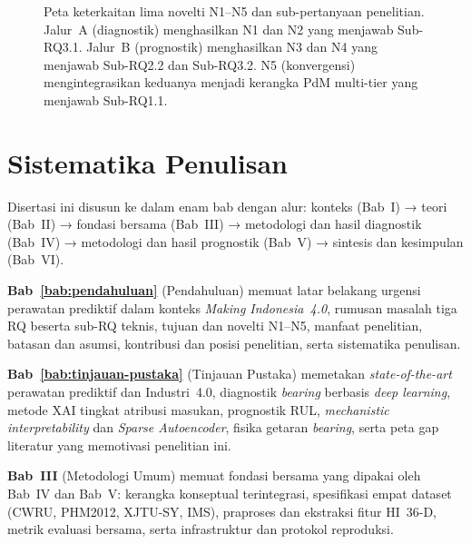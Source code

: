 \begin{figure}[ht]
{%
  }
  \caption{Peta keterkaitan lima novelti N1–N5 dan sub-pertanyaan penelitian.
           Jalur~A (diagnostik) menghasilkan N1 dan N2 yang menjawab Sub-RQ3.1.
           Jalur~B (prognostik) menghasilkan N3 dan N4 yang menjawab
           Sub-RQ2.2 dan Sub-RQ3.2.
           N5 (konvergensi) mengintegrasikan keduanya menjadi kerangka PdM
           multi-tier yang menjawab Sub-RQ1.1.}
  \label{fig:bab1_kontribusi}
\end{figure}


\section{Sistematika Penulisan}
\label{sec:bab1_sistematika}

Disertasi ini disusun ke dalam enam bab dengan alur: konteks (Bab~I)
→ teori (Bab~II) → fondasi bersama (Bab~III) → metodologi dan hasil
diagnostik (Bab~IV) → metodologi dan hasil prognostik (Bab~V)
→ sintesis dan kesimpulan (Bab~VI).

\textbf{Bab~\ref{bab:pendahuluan}} (Pendahuluan) memuat latar belakang
urgensi perawatan prediktif dalam konteks \emph{Making Indonesia~4.0},
rumusan masalah tiga RQ beserta sub-RQ teknis, tujuan dan novelti
N1–N5, manfaat penelitian, batasan dan asumsi, kontribusi dan posisi
penelitian, serta sistematika penulisan.

\textbf{Bab~\ref{bab:tinjauan-pustaka}} (Tinjauan Pustaka) memetakan
\emph{state-of-the-art} perawatan prediktif dan Industri~4.0,
diagnostik \emph{bearing} berbasis \emph{deep learning}, metode XAI tingkat
atribusi masukan, prognostik RUL, \emph{mechanistic interpretability}
dan \emph{Sparse Autoencoder}, fisika getaran \emph{bearing}, serta peta
gap literatur yang memotivasi penelitian ini.

\textbf{Bab~III} (Metodologi Umum) memuat fondasi bersama yang
dipakai oleh Bab~IV dan Bab~V: kerangka konseptual terintegrasi,
spesifikasi empat dataset (CWRU, PHM2012, XJTU-SY, IMS), praproses
dan ekstraksi fitur HI~36-D, metrik evaluasi bersama, serta
infrastruktur dan protokol reproduksi.

